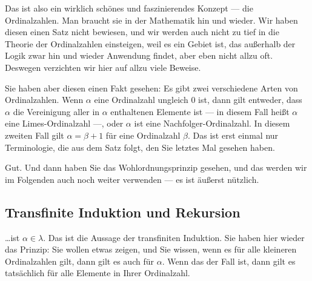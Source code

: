 \begin{spoken-clean}[00:22:24 - 00:24:41]
Das ist also ein wirklich schönes und faszinierendes Konzept --- die Ordinalzahlen. Man braucht sie in der Mathematik hin und wieder. Wir haben diesen einen Satz nicht bewiesen, und wir werden auch nicht zu tief in die Theorie der Ordinalzahlen einsteigen, weil es ein Gebiet ist, das außerhalb der Logik zwar hin und wieder Anwendung findet, aber eben nicht allzu oft. Deswegen verzichten wir hier auf allzu viele Beweise.

Sie haben aber diesen einen Fakt gesehen: Es gibt zwei verschiedene Arten von Ordinalzahlen. Wenn $\alpha$ eine Ordinalzahl ungleich $0$ ist, dann gilt entweder, dass $\alpha$ die Vereinigung aller in $\alpha$ enthaltenen Elemente ist --- in diesem Fall heißt $\alpha$ eine Limes-Ordinalzahl ---, oder $\alpha$ ist eine Nachfolger-Ordinalzahl. In diesem zweiten Fall gilt $\alpha = \beta + 1$ für eine Ordinalzahl $\beta$. Das ist erst einmal nur Terminologie, die aus dem Satz folgt, den Sie letztes Mal gesehen haben.

Gut. Und dann haben Sie das Wohlordnungsprinzip gesehen, und das werden wir im Folgenden auch noch weiter verwenden --- es ist äußerst nützlich.
\end{spoken-clean}

\begin{math-stroke}
\end{math-stroke}

\subsection{Transfinite Induktion und Rekursion}

\begin{spoken-clean}[00:28:40 - 00:29:30]
\dots ist $\alpha \in \lambda$. Das ist die Aussage der transfiniten Induktion. Sie haben hier wieder das Prinzip: Sie wollen etwas zeigen, und Sie wissen, wenn es für alle kleineren Ordinalzahlen gilt, dann gilt es auch für $\alpha$. Wenn das der Fall ist, dann gilt es tatsächlich für alle Elemente in Ihrer Ordinalzahl.
\end{spoken-clean}

